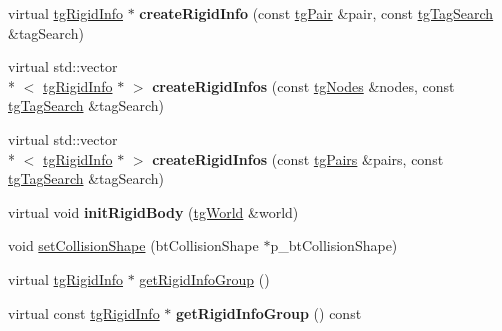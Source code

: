 \begin{DoxyCompactItemize}
\item 
\hypertarget{classtg_rigid_info_aec3117ed1b4e6561930fa2709805073e}{virtual \hyperlink{classtg_rigid_info}{tg\-Rigid\-Info} $\ast$ {\bfseries create\-Rigid\-Info} (const \hyperlink{classtg_pair}{tg\-Pair} \&pair, const \hyperlink{classtg_tag_search}{tg\-Tag\-Search} \&tag\-Search)}\label{classtg_rigid_info_aec3117ed1b4e6561930fa2709805073e}

\item 
\hypertarget{classtg_rigid_info_a54605e906e00a814e1494375602e02ee}{virtual std\-::vector\\*
$<$ \hyperlink{classtg_rigid_info}{tg\-Rigid\-Info} $\ast$ $>$ {\bfseries create\-Rigid\-Infos} (const \hyperlink{classtg_nodes}{tg\-Nodes} \&nodes, const \hyperlink{classtg_tag_search}{tg\-Tag\-Search} \&tag\-Search)}\label{classtg_rigid_info_a54605e906e00a814e1494375602e02ee}

\item 
\hypertarget{classtg_rigid_info_a3707c0ddac713beb6287525765f9bd02}{virtual std\-::vector\\*
$<$ \hyperlink{classtg_rigid_info}{tg\-Rigid\-Info} $\ast$ $>$ {\bfseries create\-Rigid\-Infos} (const \hyperlink{classtg_pairs}{tg\-Pairs} \&pairs, const \hyperlink{classtg_tag_search}{tg\-Tag\-Search} \&tag\-Search)}\label{classtg_rigid_info_a3707c0ddac713beb6287525765f9bd02}

\item 
\hypertarget{classtg_rigid_info_ae6a36e5b07c69730e95fc1fef2c1cc7f}{virtual void {\bfseries init\-Rigid\-Body} (\hyperlink{classtg_world}{tg\-World} \&world)}\label{classtg_rigid_info_ae6a36e5b07c69730e95fc1fef2c1cc7f}

\item 
void \hyperlink{classtg_rigid_info_a8b6d9ed5609dad929593f6f7f82d3f92}{set\-Collision\-Shape} (bt\-Collision\-Shape $\ast$p\-\_\-bt\-Collision\-Shape)
\item 
virtual \hyperlink{classtg_rigid_info}{tg\-Rigid\-Info} $\ast$ \hyperlink{classtg_rigid_info_a1a0d5dcdb3794c8772abd8d93a646e54}{get\-Rigid\-Info\-Group} ()
\item 
\hypertarget{classtg_rigid_info_aded8e887331027bee5ef4b64b44f455b}{virtual const \hyperlink{classtg_rigid_info}{tg\-Rigid\-Info} $\ast$ {\bfseries get\-Rigid\-Info\-Group} () const }\label{classtg_rigid_info_aded8e887331027bee5ef4b64b44f455b}


\end{DoxyCompactItemize}
